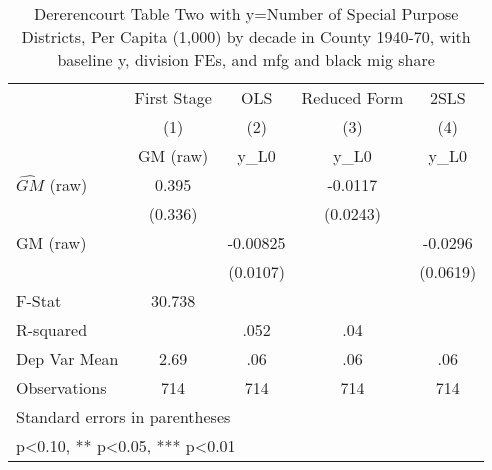 \begin{table}[htbp]\centering
\def\sym#1{\ifmmode^{#1}\else\(^{#1}\)\fi}
\caption{Dererencourt Table Two with y=Number of Special Purpose Districts, Per Capita (1,000) by decade in County 1940-70, with baseline y, division FEs, and mfg and black mig share}
\begin{tabular}{l*{4}{c}}
\toprule
                    & First Stage   &         OLS   &Reduced Form   &        2SLS   \\
                    &\multicolumn{1}{c}{(1)}&\multicolumn{1}{c}{(2)}&\multicolumn{1}{c}{(3)}&\multicolumn{1}{c}{(4)}\\
                    &\multicolumn{1}{c}{GM  (raw)}&\multicolumn{1}{c}{y\_L0}&\multicolumn{1}{c}{y\_L0}&\multicolumn{1}{c}{y\_L0}\\
\midrule
$\hat{GM}$ (raw)    &       0.395   &               &     -0.0117   &               \\
                    &     (0.336)   &               &    (0.0243)   &               \\
\addlinespace
GM  (raw)           &               &    -0.00825   &               &     -0.0296   \\
                    &               &    (0.0107)   &               &    (0.0619)   \\
\midrule
F-Stat              &      30.738   &               &               &               \\
R-squared           &               &        .052   &         .04   &               \\
Dep Var Mean        &        2.69   &         .06   &         .06   &         .06   \\
Observations        &         714   &         714   &         714   &         714   \\
\bottomrule
\multicolumn{5}{l}{\footnotesize Standard errors in parentheses}\\
\multicolumn{5}{l}{\footnotesize * p<0.10, ** p<0.05, *** p<0.01}\\
\end{tabular}
\end{table}
